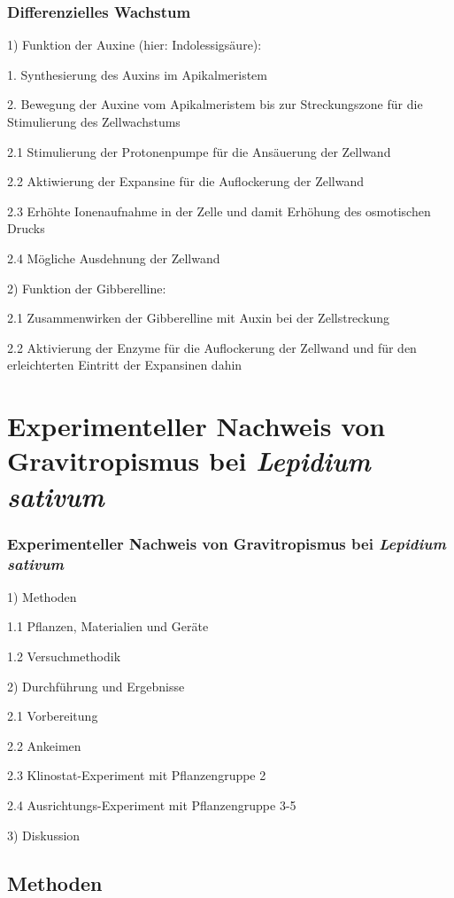 \documentclass[aspectratio=169]{beamer}
\begin{document}
	\begin{frame}
\frametitle{Differenzielles Wachstum}

 1) Funktion der Auxine (hier: Indolessigsäure): 
 
 1. Synthesierung des Auxins im Apikalmeristem
 
 2. Bewegung der Auxine vom Apikalmeristem bis zur Streckungszone für die Stimulierung des Zellwachstums
 
 2.1 Stimulierung der Protonenpumpe für die Ansäuerung der Zellwand 
 
 2.2 Aktiwierung der Expansine für die Auflockerung der Zellwand
 
 2.3 Erhöhte Ionenaufnahme in der Zelle und damit Erhöhung des osmotischen Drucks
 
 2.4 Mögliche Ausdehnung der Zellwand
 
 2) Funktion der Gibberelline:
 
 2.1 Zusammenwirken der Gibberelline mit Auxin bei der Zellstreckung
 
 2.2 Aktivierung der Enzyme für die Auflockerung der Zellwand und für den erleichterten Eintritt der Expansinen dahin
 
 
 
 
\end{frame}
	
	\section{Experimenteller Nachweis von Gravitropismus bei \protect\emph{Lepidium sativum}}
	
	\begin{frame}
		\frametitle{Experimenteller Nachweis von Gravitropismus bei \protect\emph{Lepidium sativum}}
		
		1) Methoden
		
		1.1 Pflanzen, Materialien und Geräte
		
		1.2 Versuchmethodik
		
		2) Durchführung und Ergebnisse
		
		2.1 Vorbereitung 
		
		2.2 Ankeimen 
		
		2.3 Klinostat-Experiment mit Pflanzengruppe 2
		
		2.4 Ausrichtungs-Experiment mit Pflanzengruppe 3-5
		
		3) Diskussion
		
	\end{frame}	
	
	\subsection{Methoden}
	
\end{document}
